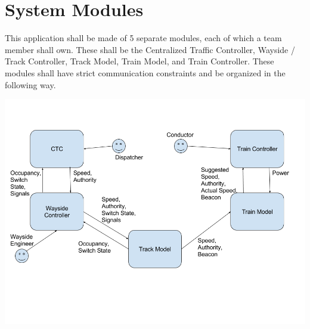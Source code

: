 \documentclass{scrreprt}
\begin{document}



\chapter{System Modules}
This application shall be made of 5 separate modules, each of which a team member shall own.
These shall be the Centralized Traffic Controller, Wayside / Track Controller, Track Model, Train Model, and Train Controller.
These modules shall have strict communication constraints and be organized in the following way.

\includegraphics[width=\textwidth]{srs-module-overview}
\end{document}
